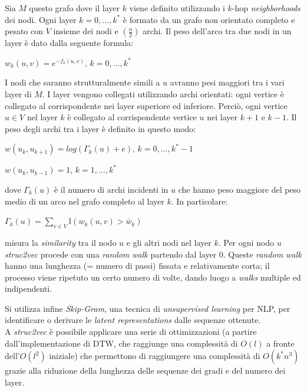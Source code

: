 \documentclass[11pt]{article}
\begin{document}
Sia $M$ questo grafo dove il layer $k$ viene definito utilizzando i $k$-hop \textit{neighborhoods} dei nodi. Ogni layer $k = 0,...,k^*$ è formato da un grafo non orientato completo e pesato con $V$ insieme dei nodi e $\displaystyle{\left(\frac{n}{2}\right)}$ archi. Il peso dell'arco tra due nodi in un layer è dato dalla seguente formula:
\begin{center}
$w_k(u,v) = e^{-f_k(u,v)}$, $k = 0,...,k^*$
\end{center}
I nodi che saranno strutturalmente simili a $u$ avranno pesi maggiori tra i vari layer di $M$. I layer vengono collegati utilizzando archi orientati: ogni vertice è collegato al corrispondente nei layer superiore ed inferiore. Perciò, ogni vertice $u \in V$ nel layer $k$ è collegato al corrispondente vertice $u$ nei layer $k+1$ e $k-1$. Il peso degli archi tra i layer è definito in questo modo:
\begin{center}
$w(u_k,u_{k+1}) = log(\Gamma_k(u) + e)$, $k = 0,...,k^*-1$
\end{center}
\begin{center}
$w(u_k,u_{k-1}) = 1$, $k = 1,...,k^*$
\end{center}
dove $\Gamma_k(u)$ è il numero di archi incidenti in $u$ che hanno peso maggiore del peso medio di un arco nel grafo completo al layer $k$. In particolare:
\begin{center}
$\Gamma_k(u) = \displaystyle{\sum_{v \in V}} \mathbb{I}(w_k(u,v) > \bar w_k)$
\end{center}
misura la \textit{similarity} tra il nodo $u$ e gli altri nodi nel layer $k$.
Per ogni nodo $u$ \textit{struc2vec} procede con una \textit{random walk} partendo dal layer 0. Queste \textit{random walk} hanno una lunghezza (= numero di passi) fissata e relativamente corta; il processo viene ripetuto un certo numero di volte, dando luogo a \textit{walks} multiple ed indipendenti.

Si utilizza infine \textit{Skip-Gram}, una tecnica di \textit{unsupervised learning} per NLP, per identificare o derivare le \textit{latent representations} dalle sequenze ottenute.\\

A \textit{struc2vec} è possibile applicare una serie di ottimizzazioni (a partire dall'implementazione di DTW, che raggiunge una complessità di $O(l)$ a fronte dell'$O(l^2)$ iniziale) che permettono di raggiungere una complessità di $O(k^*n^3)$ grazie alla riduzione della lunghezza delle sequenze dei gradi e del numero dei layer.
\pagebreak
\end{document}
